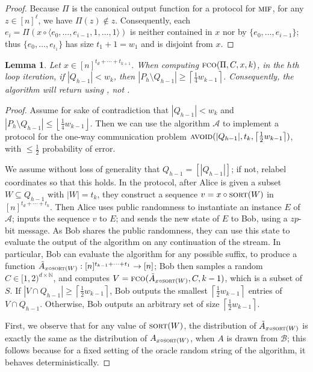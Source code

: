\documentclass[10pt,a4paper]{article}
\newtheorem{lemma}[theorem]{Lemma}
\theoremstyle{definition}
\theoremstyle{remark}
\newcommand{\NN}{\mathbb{N}}
\newcommand{\cA}{\mathcal{A}}
\newcommand{\cB}{\mathcal{B}}
\newcommand{\ceil}[1]{{\left\lceil{#1}\right\rceil}}
\newcommand{\floor}[1]{{\left\lfloor{#1}\right\rfloor}}
\newcommand{\avoid}{\textsc{avoid}\xspace}
\newcommand{\mif}{\textsc{mif}\xspace}
\newcommand{\fco}{\textsc{fco}\xspace}
\newcommand{\sort}{\textsc{sort}\xspace}
\newcommand{\rl}{\mathbf{\ell}}             %
\newcommand{\concat}{\mathbin{\circ}}       %
\begin{document}
\begin{itemize}
\begin{itemize}
\begin{proof}
  Because $\Pi$ is the canonical output function for a protocol for $\mif$,
  for any $z \in [n]^\rl$, we have $\Pi(z) \notin z$. Consequently, each $e_i
  = \Pi(x \concat \langle e_0, \ldots, e_{i-1}, 1, \ldots, 1\rangle)$ is
  neither contained in $x$ nor by $\{e_0,\ldots,e_{i-1}\}$; thus
  $\{e_0,\ldots,e_{t_1}\}$ has size $t_1 + 1 = w_1$ and is disjoint from $x$.
\end{proof}

\begin{lemma}\label{lem:pd-set-growth}
  Let $x \in [n]^{t_d+\cdots+t_{k+1}}$. 
  When computing $\fco(\Pi,C,x,k)$, in the $h$th loop iteration, if $|Q_{h -
  1}| < w_k$, then $|P_h \setminus Q_{h-1}| \ge \ceil{\frac{1}{4} w_{k-1}}$.
  Consequently, the algorithm will return using ,
  not .
\end{lemma}
%
\begin{proof}%
  Assume for sake of contradiction that $|Q_{h - 1}| < w_k$ and $|P_h
  \setminus Q_{h-1}| \le \floor{\frac{1}{4} w_{k-1}}$. Then we can use the
  algorithm $\cA$ to implement a protocol for the one-way communication
  problem $\avoid(|Q_{h-1}|, t_k, \ceil{\frac{1}{2} w_{k-1}})$, with $\le
  \frac{1}{2}$ probability of error.
  
  We assume without loss of generality that $Q_{h-1} = [|Q_{h-1}|]$; if not,
  relabel coordinates so that this holds. In the protocol, after Alice is
  given a subset $W \subseteq Q_{h-1}$ with $|W| = t_k$, they construct a
  sequence $v = x \concat \sort(W)$ in $[n]^{t_d + \cdots + t_k}$.  Then Alice
  uses public randomness to instantiate an instance $E$ of $\cA$;  inputs the
  sequence $v$ to $E$; and sends the new state of $E$ to Bob, using a $z
  p$-bit message. As Bob shares the public randomness,  they can use this
  state to evaluate the output of the algorithm on any continuation of the
  stream. In particular, Bob can evaluate the algorithm for any possible
  suffix, to produce a function $\tilde{A}_{x \concat \sort(W)} :
  [n]^{t_{k-1}+\cdots+t_1} \rightarrow [n]$; Bob then samples a random $C \in
  [1,2)^{d \times \NN}$, and computes $V = \fco(\tilde{A}_{x \concat
  \sort(W)}, C, k-1)$, which is a subset of $S$. If $|V \cap Q_{h-1}| \ge
  \ceil{\frac{1}{2} w_{k-1}}$, Bob outputs the smallest $\ceil{\frac{1}{2}
  w_{k-1}}$ entries of $V \cap Q_{h-1}$. Otherwise, Bob outputs an arbitrary
  set of size $\ceil{\frac{1}{2} w_{k-1}}$.
  
  First, we observe that for any value of $\sort(W)$, the distribution of
  $\tilde{A}_{x \concat \sort(W)}$
  is exactly the same as the distribution of $A_{x \concat \sort(W)}$, when $A$ is drawn from $\cB$;
  this follows because for a fixed setting of the oracle random string of the algorithm,
  it behaves deterministically.
  

\end{proof}
\end{itemize}
\end{itemize}
\end{document}
